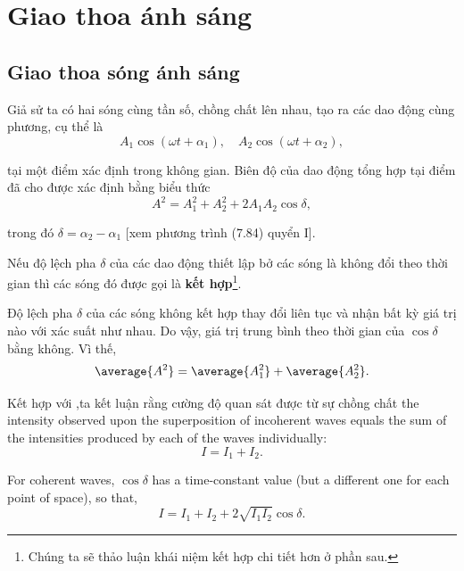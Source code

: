 

\chapter[Giao thoa ánh sáng]{Giao thoa ánh sáng}\label{chap:17}

\section{Giao thoa sóng ánh sáng}\label{sec:17_1}

Giả sử ta có hai sóng cùng tần số, chồng chất lên nhau, tạo ra các dao động cùng phương, cụ thể là
\begin{equation*}
    A_1 \cos(\omega t + \alpha_1),\quad A_2 \cos(\omega t + \alpha_2),
\end{equation*}

\noindent
tại một điểm xác định trong không gian.
Biên độ của dao động tổng hợp tại điểm đã cho được xác định bằng biểu thức
\begin{equation*}
    A^2 = A_1^2 + A_2^2 + 2 A_1 A_2 \cos\delta,
\end{equation*}

\noindent
trong đó $\delta=\alpha_2-\alpha_1$ [xem phương trình (7.84) quyển I].

Nếu độ lệch pha $\delta$ của các dao động thiết lập bở các sóng là không đổi theo thời gian thì các sóng đó được gọi là \textbf{kết hợp}\footnote{Chúng ta sẽ thảo luận khái niệm kết hợp chi tiết hơn ở phần sau.}.

Độ lệch pha $\delta$ của các sóng không kết hợp thay đổi liên tục và nhận bất kỳ giá trị nào với xác suất như nhau.
Do vậy, giá trị trung bình theo thời gian của $\cos\delta$ bằng không.
Vì thế,
\begin{equation*}
    \average{A^2} = \average{A_1^2} + \average{A_2^2}.
\end{equation*}

\noindent
Kết hợp với ,ta kết luận rằng cường độ quan sát được từ sự chồng chất 
the intensity observed upon the superposition of incoherent waves equals the sum of the intensities produced by each of the waves individually:
\begin{equation}\label{eq:17_1}
    I = I_1 + I_2.
\end{equation}

For coherent waves, $\cos\delta$ has a time-constant value (but a different one for each point of space), so that,
\begin{equation}\label{eq:17_2}
    I = I_1 + I_2 + 2 \sqrt{I_1 I_2} \cos \delta.
\end{equation}

